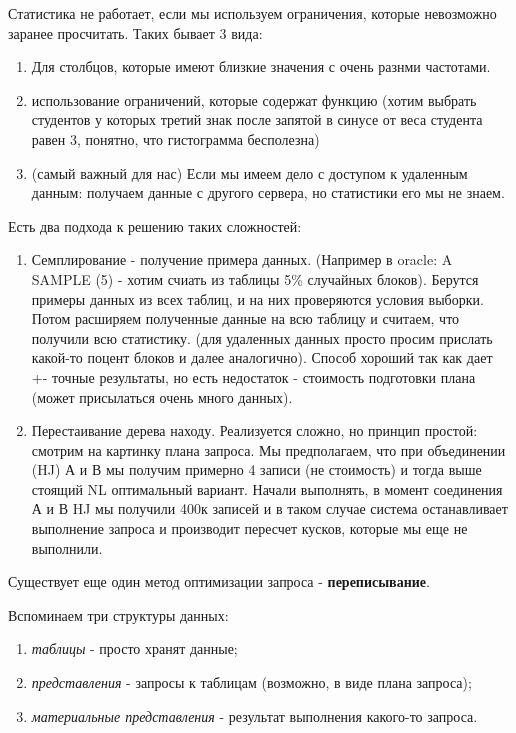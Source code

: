 \begin{itemize}
Статистика не работает, если мы используем ограничения, которые невозможно заранее просчитать. Таких бывает 3 вида: 
\begin{enumerate}
    \item Для столбцов, которые имеют близкие значения с очень разнми частотами.
    \item использование ограничений, которые содержат функцию (хотим выбрать студентов у которых третий знак после запятой в синусе от веса студента равен 3, понятно, что гистограмма бесполезна) 
    \item (самый важный для нас) Если мы имеем дело с доступом к удаленным данным: получаем данные с другого сервера, но статистики его мы не знаем.
\end{enumerate}

Есть два подхода к решению таких сложностей: 

\begin{enumerate}
    \item Семплирование - получение примера данных. (Например в oracle: A SAMPLE (5) - хотим счиать из таблицы 5\% случайных блоков). Берутся примеры данных из всех таблиц, и на них проверяются условия выборки. Потом расширяем полученные данные на всю таблицу и считаем, что получили всю статистику. (для удаленных данных просто просим прислать какой-то поцент блоков и далее аналогично). Способ хороший так как дает +- точные результаты, но есть недостаток - стоимость подготовки плана (может присылаться очень много данных).
    \item Перестаивание дерева находу. Реализуется сложно, но принцип простой:  смотрим на картинку плана запроса. Мы предполагаем, что при объединении (HJ) А и В мы получим примерно 4 записи (не стоимость) и тогда выше стоящий NL оптимальный вариант. Начали выполнять, в момент соединения А и В HJ мы получили 400к записей и в таком случае система останавливает выполнение запроса и производит пересчет кусков, которые мы еще не выполнили.
\end{enumerate}
\end{itemize}

Существует еще один метод оптимизации запроса - \textbf{переписывание}. 

Вспоминаем три структуры данных: 

\begin{enumerate}
    \item \textit{таблицы} - просто хранят данные;
    \item  \textit{представления} - запросы к таблицам (возможно, в виде плана запроса);
    \item \textit{материальные представления} - результат выполнения какого-то запроса. 
\end{enumerate}

